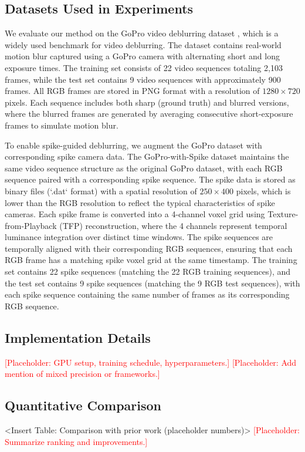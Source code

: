 \documentclass[conference]{IEEEtran}
\newcommand{\placeholder}[1]{\textcolor{red}{[Placeholder: #1]}}
\begin{document}
\subsection{Datasets Used in Experiments}
We evaluate our method on the GoPro video deblurring dataset \cite{nah_deep_2017}, which is a widely used benchmark for video deblurring. The dataset contains real-world motion blur captured using a GoPro camera with alternating short and long exposure times. The training set consists of 22 video sequences totaling 2,103 frames, while the test set contains 9 video sequences with approximately 900 frames. All RGB frames are stored in PNG format with a resolution of $1280 \times 720$ pixels. Each sequence includes both sharp (ground truth) and blurred versions, where the blurred frames are generated by averaging consecutive short-exposure frames to simulate motion blur.

To enable spike-guided deblurring, we augment the GoPro dataset with corresponding spike camera data. The GoPro-with-Spike dataset maintains the same video sequence structure as the original GoPro dataset, with each RGB sequence paired with a corresponding spike sequence. The spike data is stored as binary files (`.dat` format) with a spatial resolution of $250 \times 400$ pixels, which is lower than the RGB resolution to reflect the typical characteristics of spike cameras. Each spike frame is converted into a 4-channel voxel grid using Texture-from-Playback (TFP) reconstruction, where the 4 channels represent temporal luminance integration over distinct time windows. The spike sequences are temporally aligned with their corresponding RGB sequences, ensuring that each RGB frame has a matching spike voxel grid at the same timestamp. The training set contains 22 spike sequences (matching the 22 RGB training sequences), and the test set contains 9 spike sequences (matching the 9 RGB test sequences), with each spike sequence containing the same number of frames as its corresponding RGB sequence.

\subsection{Implementation Details}
\placeholder{GPU setup, training schedule, hyperparameters.}
\placeholder{Add mention of mixed precision or frameworks.}

\subsection{Quantitative Comparison}
<Insert Table: Comparison with prior work (placeholder numbers)>
\placeholder{Summarize ranking and improvements.}
\end{document}
